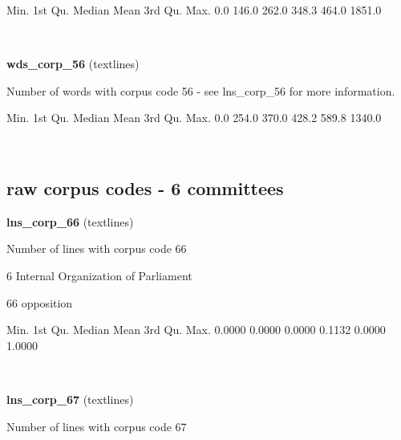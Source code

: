 \documentclass[]{article}
\newenvironment{Shaded}{\begin{snugshade}}{\end{snugshade}}
\newcommand{\FloatTok}[1]{\textcolor[rgb]{0.00,0.00,0.81}{{#1}}}
\newcommand{\NormalTok}[1]{{#1}}
\begin{document}
\begin{Shaded}
\begin{Highlighting}[]
   \NormalTok{Min. 1st Qu.  Median    Mean 3rd Qu.    Max. }
    \FloatTok{0.0}   \FloatTok{146.0}   \FloatTok{262.0}   \FloatTok{348.3}   \FloatTok{464.0}  \FloatTok{1851.0} 
\end{Highlighting}
\end{Shaded}

~

\vspace{1em}

\textbf{wds\_corp\_56} (textlines)

Number of words with corpus code 56 - see lns\_corp\_56 for more
information.

\begin{Shaded}
\begin{Highlighting}[]
   \NormalTok{Min. 1st Qu.  Median    Mean 3rd Qu.    Max. }
    \FloatTok{0.0}   \FloatTok{254.0}   \FloatTok{370.0}   \FloatTok{428.2}   \FloatTok{589.8}  \FloatTok{1340.0} 
\end{Highlighting}
\end{Shaded}

~

\vspace{1em}

\subsection{raw corpus codes - 6
committees}\label{raw-corpus-codes---6-committees}

\textbf{lns\_corp\_66} (textlines)

Number of lines with corpus code 66

6 Internal Organization of Parliament

66 opposition

\begin{Shaded}
\begin{Highlighting}[]
   \NormalTok{Min. 1st Qu.  Median    Mean 3rd Qu.    Max. }
 \FloatTok{0.0000}  \FloatTok{0.0000}  \FloatTok{0.0000}  \FloatTok{0.1132}  \FloatTok{0.0000}  \FloatTok{1.0000} 
\end{Highlighting}
\end{Shaded}

~

\vspace{1em}

\textbf{lns\_corp\_67} (textlines)

Number of lines with corpus code 67
\end{document}

